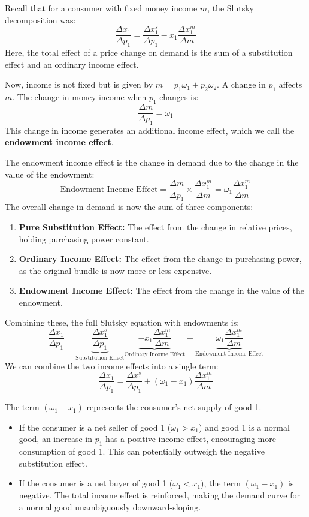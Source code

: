 Recall that for a consumer with fixed money income $m$, the Slutsky decomposition was:
\[
\frac{\Delta x_1}{\Delta p_1} = \frac{\Delta x_1^s}{\Delta p_1} - x_1 \frac{\Delta x_1^m}{\Delta m}
\]
Here, the total effect of a price change on demand is the sum of a substitution effect and an ordinary income effect.

Now, income is not fixed but is given by $m = p_1 \omega_1 + p_2 \omega_2$. A change in $p_1$ affects $m$. The change in money income when $p_1$ changes is:
\[
\frac{\Delta m}{\Delta p_1} = \omega_1
\]
This change in income generates an additional income effect, which we call the \textbf{endowment income effect}.

The endowment income effect is the change in demand due to the change in the value of the endowment:
\[
\text{Endowment Income Effect} = \frac{\Delta m}{\Delta p_1} \times \frac{\Delta x_1^m}{\Delta m} = \omega_1 \frac{\Delta x_1^m}{\Delta m}
\]
The overall change in demand is now the sum of three components:
\begin{enumerate}
    \item \textbf{Pure Substitution Effect:} The effect from the change in relative prices, holding purchasing power constant.
    \item \textbf{Ordinary Income Effect:} The effect from the change in purchasing power, as the original bundle is now more or less expensive.
    \item \textbf{Endowment Income Effect:} The effect from the change in the value of the endowment.
\end{enumerate}

Combining these, the full Slutsky equation with endowments is:
\[
\frac{\Delta x_1}{\Delta p_1} = \underbrace{\frac{\Delta x_1^s}{\Delta p_1}}_{\text{Substitution Effect}} \underbrace{- x_1 \frac{\Delta x_1^m}{\Delta m}}_{\text{Ordinary Income Effect}} + \underbrace{\omega_1 \frac{\Delta x_1^m}{\Delta m}}_{\text{Endowment Income Effect}}
\]
We can combine the two income effects into a single term:
\begin{equation}
\frac{\Delta x_1}{\Delta p_1} = \frac{\Delta x_1^s}{\Delta p_1} + (\omega_1 - x_1) \frac{\Delta x_1^m}{\Delta m}
\label{eq:slutsky_endowment}
\end{equation}

\begin{remark}
    The term $(\omega_1 - x_1)$ represents the consumer's net supply of good 1.
    \begin{itemize}
        \item If the consumer is a net seller of good 1 ($\omega_1 > x_1$) and good 1 is a normal good, an increase in $p_1$ has a positive income effect, encouraging more consumption of good 1. This can potentially outweigh the negative substitution effect.
        \item If the consumer is a net buyer of good 1 ($\omega_1 < x_1$), the term $(\omega_1 - x_1)$ is negative. The total income effect is reinforced, making the demand curve for a normal good unambiguously downward-sloping.
    \end{itemize}
\end{remark}

